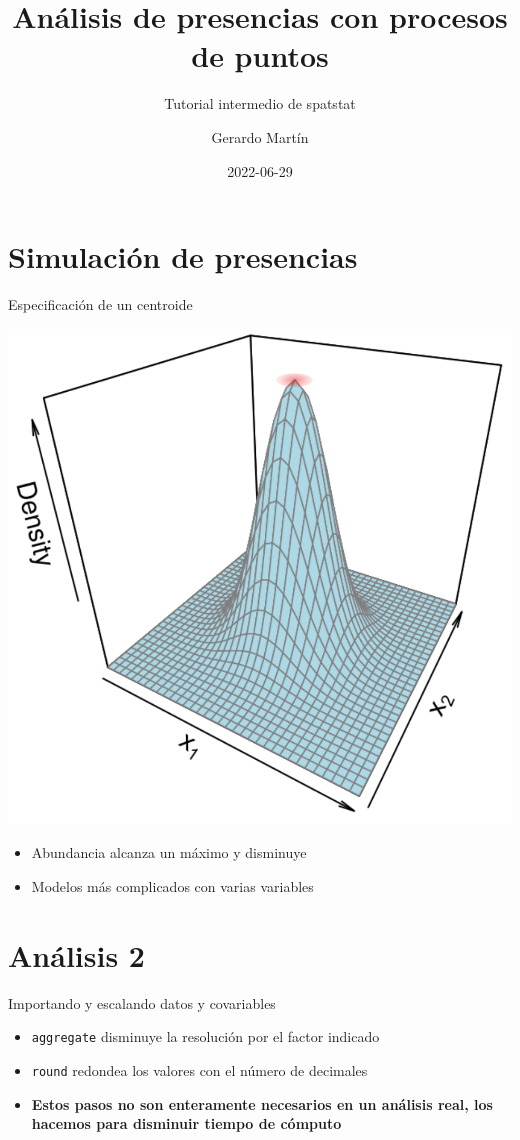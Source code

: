 \documentclass[
  11pt,
  ignorenonframetext,
]{beamer}
\title{Análisis de presencias con procesos de puntos}
\subtitle{Tutorial intermedio de spatstat}
\author{Gerardo Martín}
\date{2022-06-29}
\providecommand{\tightlist}{%
  \setlength{\itemsep}{0pt}\setlength{\parskip}{0pt}}
\begin{document}
\frame{\titlepage}

\hypertarget{simulaciuxf3n-de-presencias}{%
\section{Simulación de presencias}\label{simulaciuxf3n-de-presencias}}

\begin{frame}{Especificación de un centroide}
\protect\hypertarget{especificaciuxf3n-de-un-centroide}{}
\begin{center}\includegraphics[width=13.28in]{Figuras/Centroide} \end{center}

\begin{itemize}
\tightlist
\item
  Abundancia alcanza un máximo y disminuye
\item
  Modelos más complicados con varias variables
\end{itemize}
\end{frame}

\hypertarget{anuxe1lisis-2}{%
\section{Análisis 2}\label{anuxe1lisis-2}}

\begin{frame}[fragile]{Importando y escalando datos y covariables}
\protect\hypertarget{importando-y-escalando-datos-y-covariables}{}
\begin{itemize}
\item
  \texttt{aggregate} disminuye la resolución por el factor indicado
\item
  \texttt{round} redondea los valores con el número de decimales
\item
  \textbf{Estos pasos no son enteramente necesarios en un análisis real,
  los hacemos para disminuir tiempo de cómputo}
\end{itemize}
\end{frame}
\end{document}
